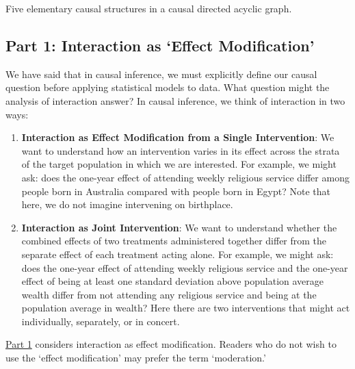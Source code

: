 \documentclass[
  single column]{article}
\begin{document}
\begin{table}

\caption{\label{tbl-terminologydirectedgraph}Five elementary causal
structures in a causal directed acyclic graph.}

\centering{

\terminologydirectedgraph

}

\end{table}%

\newpage{}

\subsection{Part 1: Interaction as `Effect
Modification'}\label{id-sec-1}

We have said that in causal inference, we must explicitly define our
causal question before applying statistical models to data. What
question might the analysis of interaction answer? In causal inference,
we think of interaction in two ways:

\begin{enumerate}
\def\labelenumi{\arabic{enumi}.}
\item
  \textbf{Interaction as Effect Modification from a Single
  Intervention}: We want to understand how an intervention varies in its
  effect across the strata of the target population in which we are
  interested. For example, we might ask: does the one-year effect of
  attending weekly religious service differ among people born in
  Australia compared with people born in Egypt? Note that here, we do
  not imagine intervening on birthplace.
\item
  \textbf{Interaction as Joint Intervention}: We want to understand
  whether the combined effects of two treatments administered together
  differ from the separate effect of each treatment acting alone. For
  example, we might ask: does the one-year effect of attending weekly
  religious service and the one-year effect of being at least one
  standard deviation above population average wealth differ from not
  attending any religious service and being at the population average in
  wealth? Here there are two interventions that might act individually,
  separately, or in concert.
\end{enumerate}

\hyperref[id-sec-1]{Part 1} considers interaction as effect
modification. Readers who do not wish to use the `effect modification'
may prefer the term `moderation.'
\end{document}
